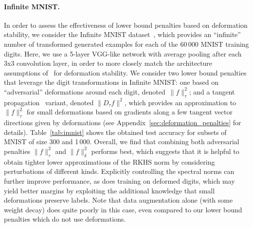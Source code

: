 \paragraph{Infinite MNIST.}
In order to assess the effectiveness of lower bound penalties based on deformation stability,
we consider the Infinite MNIST dataset~\citep{loosli-canu-bottou-2006}, which provides an ``infinite''
number of transformed generated examples for each of the 60\,000 MNIST training digits.
Here, we use a 5-layer VGG-like network with average pooling after each 3x3 convolution layer,
in order to more closely match the architecture assumptions of~\citet{bietti2018group}
for deformation stability.
We consider two lower bound penalties that leverage the digit transformations in Infinite MNIST:
one based on ``adversarial'' deformations around each digit, denoted~$\|f\|_\tau^2$;
and a tangent propagation~\citep{simard1998transformation} variant, denoted $\|D_\tau f\|^2$,
which provides an approximation to~$\|f\|_\tau^2$ for small deformations
based on gradients along a few tangent vector directions given by deformations
(see Appendix~\ref{sec:deformation_penalties} for details).
Table~\ref{tab:imnist} shows the obtained test accuracy for subsets of MNIST of size 300 and 1\,000.
Overall, we find that combining both adversarial penalties $\|f\|_\tau^2$ and $\|f\|_\delta^2$
performs best, which suggests that it is helpful to obtain tighter lower approximations of the RKHS
norm by considering perturbations of different kinds.
Explicitly controlling the spectral norms can further improve performance,
as does training on deformed digits, which may yield better margins
by exploiting the additional knowledge that small deformations preserve labels.
Note that data augmentation alone (with some weight decay) does quite poorly in this case,
even compared to our lower bound penalties which do not use deformations.


